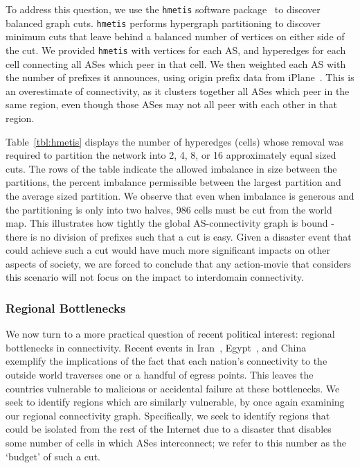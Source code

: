     To address this question, we use the {\tt hmetis} software package~\cite{hmetis} to discover balanced graph cuts.
    {\tt hmetis} performs hypergraph partitioning to discover minimum cuts that leave behind a balanced number of vertices on either side of the cut.
    We provided {\tt hmetis} with vertices for each AS, and hyperedges for each cell connecting all ASes which peer in that cell. 
    We then weighted each AS with the number of prefixes it announces, using origin prefix data from iPlane~\cite{iplane}.
    This is an overestimate of connectivity, as it clusters together all ASes which peer in the same region, even though those ASes may not all peer with each other in that region.
 
    Table~\ref{tbl:hmetis} displays the number of hyperedges (cells) whose removal was required to partition the network into  2, 4, 8, or 16 approximately equal sized cuts. 
    The rows of the table indicate the allowed imbalance in size between the partitions, the percent imbalance permissible between the largest partition and the average sized partition.
    We observe that even when imbalance is generous and the partitioning is only into two halves, 986 cells must be cut from the world map.
    This illustrates how tightly the global AS-connectivity graph is bound - there is no division of prefixes such that a cut is easy.
    Given a disaster event that could achieve such a cut would have much more significant impacts on other aspects of society, we are forced to conclude that any action-movie that considers this scenario will not focus on the impact to interdomain connectivity.
    
    \subsubsection*{Regional Bottlenecks}
    We now turn to a more practical question of recent political interest: regional bottlenecks in connectivity.
    Recent events in Iran~\cite{iran}, Egypt~\cite{egypt}, and China~\cite{china} exemplify the implications of the fact that each nation's connectivity to the outside world traverses one or a handful of egress points.
    This leaves the countries vulnerable to malicious or accidental failure at these bottlenecks.
    We seek to identify regions which are similarly vulnerable, by once again examining our regional connectivity graph. 
    Specifically, we seek to identify regions that could be isolated from the rest of the Internet due to a disaster that disables some number of cells in which ASes interconnect; we refer to this number as the `budget' of such a cut.

